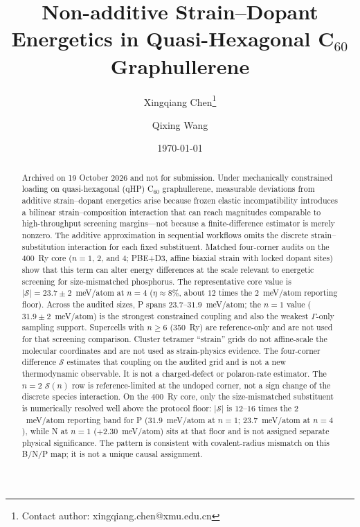 \documentclass[%
 reprint,
 groupedaddress,
 amsmath,amssymb,
 aps,
 prb,
 floatfix,
]{revtex4-2}
\begin{document}
\title{Non-additive Strain--Dopant Energetics in Quasi-Hexagonal C$_{60}$ Graphullerene}

\author{Xingqiang Chen\thanks{Contact author: xingqiang.chen@xmu.edu.cn}}
\author{Qixing Wang}
%

\date{\today}

\begin{abstract}
Archived on 19 October 2026 and not for submission.
Under mechanically constrained loading on quasi-hexagonal (qHP) C$_{60}$ graphullerene, measurable deviations from additive strain--dopant energetics arise because frozen elastic incompatibility introduces a bilinear strain--composition interaction that can reach magnitudes comparable to high-throughput screening margins---not because a finite-difference estimator is merely nonzero.
The additive approximation in sequential workflows omits the discrete strain--substitution interaction for each fixed substituent.
Matched four-corner audits on the 400~Ry core ($n{=}1$, $2$, and $4$; PBE+D3, affine biaxial strain with locked dopant sites) show that this term can alter energy differences at the scale relevant to energetic screening for size-mismatched phosphorus.
The representative core value is $|\mathcal{S}|=23.7\pm 2$~meV/atom at $n{=}4$ ($\eta\approx 8\%$, about $12$ times the $2$~meV/atom reporting floor).
Across the audited sizes, P spans $23.7$--$31.9$~meV/atom; the $n{=}1$ value ($31.9\pm 2$~meV/atom) is the strongest constrained coupling and also the weakest $\Gamma$-only sampling support.
Supercells with $n\geq 6$ (350~Ry) are reference-only and are not used for that screening comparison.
Cluster tetramer ``strain'' grids do not affine-scale the molecular coordinates and are not used as strain-physics evidence.
The four-corner difference $\mathcal{S}$ estimates that coupling on the audited grid and is not a new thermodynamic observable.
It is not a charged-defect or polaron-rate estimator.
The $n{=}2$ $\mathcal{S}(n)$ row is reference-limited at the undoped corner, not a sign change of the discrete species interaction.
On the 400~Ry core, only the size-mismatched substituent is numerically resolved well above the protocol floor: $|\mathcal{S}|$ is $12$--$16$ times the $2$~meV/atom reporting band for P ($31.9$~meV/atom at $n{=}1$; $23.7$~meV/atom at $n{=}4$), while N at $n{=}1$ ($+2.30$~meV/atom) sits at that floor and is not assigned separate physical significance. The pattern is consistent with covalent-radius mismatch on this B/N/P map; it is not a unique causal assignment.

\end{abstract}
\end{document}

